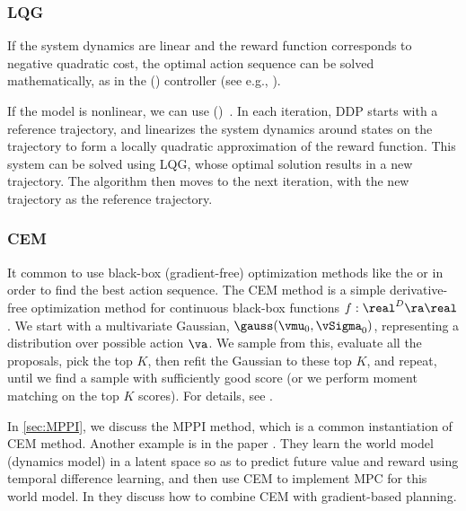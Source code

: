 \subsubsection{LQG}

If the system dynamics are linear
and the reward function corresponds to
negative quadratic cost,
the optimal action sequence can be solved
mathematically, as in the
() controller
(see e.g., \citep{Anderson89,Hoffmann2017control}).

If the model is nonlinear, we can use
()~\citep{Jacobson70,Todorov05}.
In each iteration, DDP starts with a reference trajectory,
and linearizes the system dynamics around states on
the trajectory to form a locally quadratic approximation
of the reward function.
This system can be solved using LQG,
whose optimal solution results in a new trajectory.
The algorithm then moves to the next iteration,
with the new trajectory as the reference trajectory.



\subsubsection{CEM}
\label{sec:TDMPC}
\label{sec:CEM}


It common to use
black-box (gradient-free) optimization methods
like the  or 
in order to find the best action sequence.
The CEM method is a simple derivative-free optimization
method for continuous black-box functions $f: \real^D \ra \real$.
We start with a multivariate Gaussian, $\gauss(\vmu_0,\vSigma_0)$,
representing a distribution over possible action $\va$.
We sample from this, evaluate all the proposals,
pick the top $K$, then refit the Gaussian to these top $K$,
and repeat, until we find a sample with sufficiently good score
(or we perform moment matching on the top $K$ scores).
For details, see \citep{Rubinstein1997,Rubinstein2004,DeBoer2005}.

In \cref{sec:MPPI}, we discuss the MPPI method,
which is a common instantiation of CEM method.
Another example is
in the  paper \citep{TDMPC}.
They learn the world model (dynamics model) in a latent space
so as to predict future value and reward using temporal difference learning,
and then use CEM to implement MPC for this world model.
In \citep{Bharadhwaj2020} they discuss how to combine CEM with gradient-based planning.

